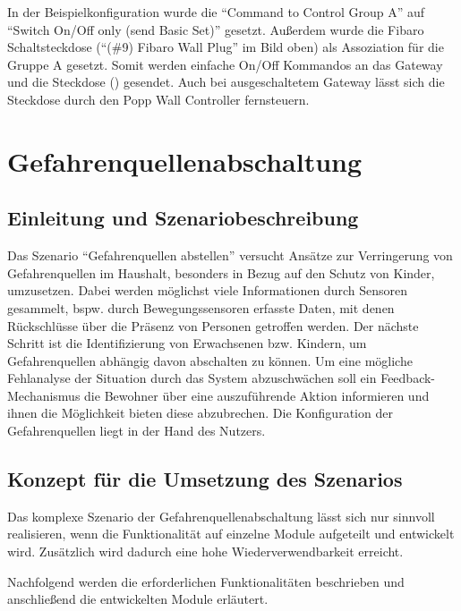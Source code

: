 In der Beispielkonfiguration wurde die "`Command to Control Group A"' auf "`Switch On/Off only (send Basic Set)"' gesetzt. Außerdem wurde die Fibaro Schaltsteckdose ("`(\#9) Fibaro Wall Plug"' im Bild oben) als Assoziation für die Gruppe A gesetzt. Somit werden einfache On/Off Kommandos an das Gateway und die Steckdose () gesendet. Auch bei ausgeschaltetem Gateway lässt sich die Steckdose durch den Popp Wall Controller fernsteuern.


\section{Gefahrenquellenabschaltung}
\label{sec:gefahrenquellenabschaltung}

\subsection{Einleitung und Szenariobeschreibung}
Das Szenario "`Gefahrenquellen abstellen"' versucht Ansätze zur Verringerung von Gefahrenquellen im Haushalt, besonders in Bezug auf den Schutz von Kinder, umzusetzen. Dabei werden möglichst viele Informationen durch Sensoren gesammelt, bspw. durch Bewegungssensoren erfasste Daten, mit denen Rückschlüsse über die Präsenz von Personen getroffen werden. Der nächste Schritt ist die Identifizierung von Erwachsenen bzw. Kindern, um Gefahrenquellen abhängig davon abschalten zu können. Um eine mögliche Fehlanalyse der Situation durch das System abzuschwächen soll ein Feedback-Mechanismus die Bewohner über eine auszuführende Aktion informieren und ihnen die Möglichkeit bieten diese abzubrechen. Die Konfiguration der Gefahrenquellen liegt in der Hand des Nutzers.

\subsection{Konzept für die Umsetzung des Szenarios}
Das komplexe Szenario der Gefahrenquellenabschaltung lässt sich nur sinnvoll realisieren, wenn die Funktionalität auf einzelne Module aufgeteilt und entwickelt wird. Zusätzlich wird dadurch eine hohe Wiederverwendbarkeit erreicht.

Nachfolgend werden die erforderlichen Funktionalitäten beschrieben und anschließend die entwickelten Module erläutert.

